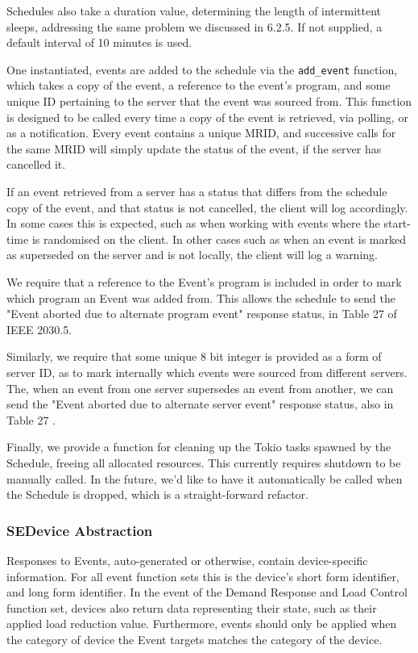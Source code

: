 Schedules also take a duration value, determining the length of intermittent sleeps, addressing the same problem we discussed in 6.2.5. If not supplied, a default interval of 10 minutes is used.

One instantiated, events are added to the schedule via the \texttt{add\_event} function, which takes a copy of the event, a reference to the event's program, and some unique ID pertaining to the server that the event was sourced from. This function is designed to be called every time a copy of the event is retrieved, via polling, or as a notification. Every event contains a unique MRID, and successive calls for the same MRID will simply update the status of the event, if the server has cancelled it. 

If an event retrieved from a server has a status that differs from the schedule copy of the event, and that status is not cancelled, the client will log accordingly. In some cases this is expected, such as when working with events where the start-time is randomised on the client. In other cases such as when an event is marked as superseded on the server and is not locally, the client will log a warning.


We require that a reference to the Event's program is included in order to mark which program an Event was added from. This allows the schedule to send the "Event aborted due to alternate program event" response status, in Table 27 of IEEE 2030.5.

Similarly, we require that some unique 8 bit integer is provided as a form of server ID, as to mark internally which events were sourced from different servers. The, when an event from one server supersedes an event from another, we can send the "Event aborted due to alternate server event" response status, also in Table 27 \cite{IEEE2030.5}. 

Finally, we provide a function for cleaning up the Tokio tasks spawned by the Schedule, freeing all allocated resources. This currently requires shutdown to be manually called. In the future, we'd like to have it automatically be called when the Schedule is dropped, which is a straight-forward refactor.

\subsubsection{SEDevice Abstraction}

Responses to Events, auto-generated or otherwise, contain device-specific information. For all event function sets this is the device's short form identifier, and long form identifier. In the event of the Demand Response and Load Control function set, devices also return data representing their state, such as their applied load reduction value.
Furthermore, events should only be applied when the category of device the Event targets matches the category of the device.

